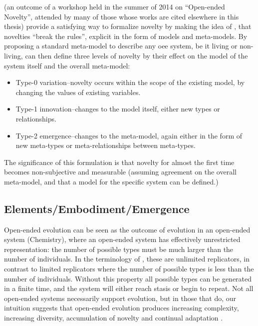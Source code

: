 \begin{NOTES}
\Cite{BanzhafBaumgaertnerBeslonEtAl2016} (an outcome of a workshop held in the summer of 2014 on ``Open-ended Novelty'', attended by many of those whose works are cited elsewhere in this thesis) provide a satisfying way to formalize novelty by making the idea of \cite{Boden2004}, that novelties ``break the rules'', explicit in the form of models and meta-models. By proposing a standard meta-model to describe any \gls{oee} system, be it living or non-living, \cite{BanzhafBaumgaertnerBeslonEtAl2016} can then define three levels of novelty by their effect on the model of the system itself and the overall meta-model:

\begin{itemize}
	\item Type-0 variation--novelty occurs within the scope of the existing model, by changing the values of existing variables.
	\item Type-1 innovation--changes to the model itself, either new types or relationships.
	\item Type-2 emergence--changes to the meta-model, again either in the form of new meta-types or meta-relationships between meta-types.
\end{itemize}
	
The significance of this formulation is that novelty for almost the first time becomes non-subjective and measurable (assuming agreement on the overall meta-model, and that a model for the specific system can be defined.)

\subsection{Elements/Embodiment/Emergence}
Open-ended evolution can be seen as the outcome of evolution in an open-ended system (\eg Chemistry), where an open-ended system has effectively unrestricted representation: the number of possible types must be much larger than the number of individuals. In the terminology of \cite{Szathmary:2006ty}, these are unlimited replicators, in contrast to limited replicators where the number of possible types is less than the number of individuals. Without this property all possible types can be generated in a finite time, and the system will either reach stasis or begin to repeat. Not all open-ended systems necessarily support evolution, but in those that do, our intuition suggests that open-ended evolution produces increasing complexity, increasing diversity, accumulation of novelty and continual adaptation \parencite{Lehman2012}.


\end{NOTES}

